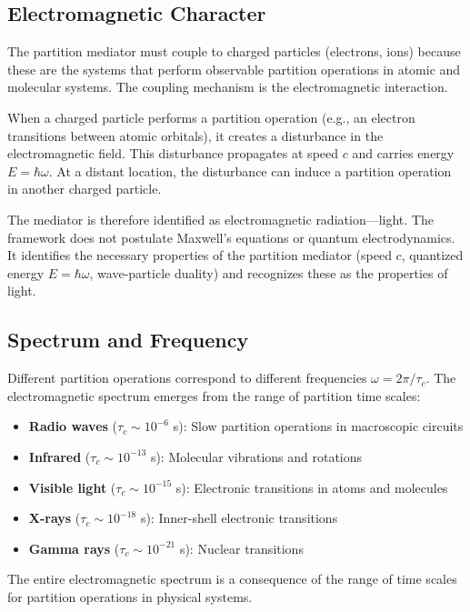 \documentclass[twocolumn,superscriptaddress,prb,10pt]{revtex4-2}
\begin{document}
\subsection{Electromagnetic Character}

The partition mediator must couple to charged particles (electrons, ions) because these are the systems that perform observable partition operations in atomic and molecular systems. The coupling mechanism is the electromagnetic interaction.

When a charged particle performs a partition operation (e.g., an electron transitions between atomic orbitals), it creates a disturbance in the electromagnetic field. This disturbance propagates at speed $c$ and carries energy $E = \hbar\omega$. At a distant location, the disturbance can induce a partition operation in another charged particle.

The mediator is therefore identified as electromagnetic radiation—light. The framework does not postulate Maxwell's equations or quantum electrodynamics. It identifies the necessary properties of the partition mediator (speed $c$, quantized energy $E = \hbar\omega$, wave-particle duality) and recognizes these as the properties of light.

\subsection{Spectrum and Frequency}

Different partition operations correspond to different frequencies $\omega = 2\pi/\tau_c$. The electromagnetic spectrum emerges from the range of partition time scales:

\begin{itemize}
\item \textbf{Radio waves} ($\tau_c \sim 10^{-6}$ s): Slow partition operations in macroscopic circuits
\item \textbf{Infrared} ($\tau_c \sim 10^{-13}$ s): Molecular vibrations and rotations
\item \textbf{Visible light} ($\tau_c \sim 10^{-15}$ s): Electronic transitions in atoms and molecules
\item \textbf{X-rays} ($\tau_c \sim 10^{-18}$ s): Inner-shell electronic transitions
\item \textbf{Gamma rays} ($\tau_c \sim 10^{-21}$ s): Nuclear transitions
\end{itemize}

The entire electromagnetic spectrum is a consequence of the range of time scales for partition operations in physical systems.
\end{document}

